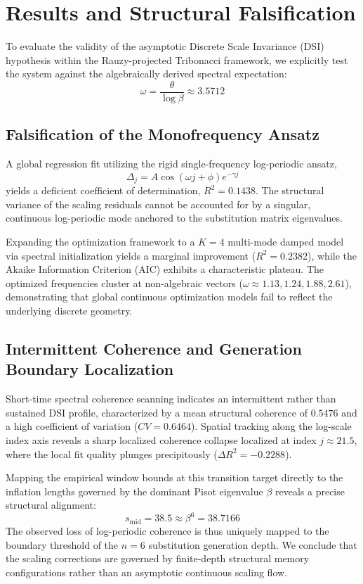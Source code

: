 \section{Results and Structural Falsification}

To evaluate the validity of the asymptotic Discrete Scale Invariance (DSI) hypothesis within the Rauzy-projected Tribonacci framework, we explicitly test the system against the algebraically derived spectral expectation:
$$\omega = \frac{\theta}{\log \beta} \approx 3.5712$$

\subsection{Falsification of the Monofrequency Ansatz}
A global regression fit utilizing the rigid single-frequency log-periodic ansatz,
\begin{equation}
\Delta_j = A \cos(\omega j + \phi) e^{-\gamma j}
\end{equation}
yields a deficient coefficient of determination, $R^2 = 0.1438$. The structural variance of the scaling residuals cannot be accounted for by a singular, continuous log-periodic mode anchored to the substitution matrix eigenvalues. 

Expanding the optimization framework to a $K=4$ multi-mode damped model via spectral initialization yields a marginal improvement ($R^2 = 0.2382$), while the Akaike Information Criterion (AIC) exhibits a characteristic plateau. The optimized frequencies cluster at non-algebraic vectors ($\omega \approx 1.13, 1.24, 1.88, 2.61$), demonstrating that global continuous optimization models fail to reflect the underlying discrete geometry.

\subsection{Intermittent Coherence and Generation Boundary Localization}
Short-time spectral coherence scanning indicates an intermittent rather than sustained DSI profile, characterized by a mean structural coherence of $0.5476$ and a high coefficient of variation ($CV = 0.6464$). Spatial tracking along the log-scale index axis reveals a sharp localized coherence collapse localized at index $j \approx 21.5$, where the local fit quality plunges precipitously ($\Delta R^2 = -0.2288$).

Mapping the empirical window bounds at this transition target directly to the inflation lengths governed by the dominant Pisot eigenvalue $\beta$ reveals a precise structural alignment:
\begin{equation}
s_{\text{mid}} = 38.5 \approx \beta^6 = 38.7166
\end{equation}
The observed loss of log-periodic coherence is thus uniquely mapped to the boundary threshold of the $n=6$ substitution generation depth. We conclude that the scaling corrections are governed by finite-depth structural memory configurations rather than an asymptotic continuous scaling flow.

